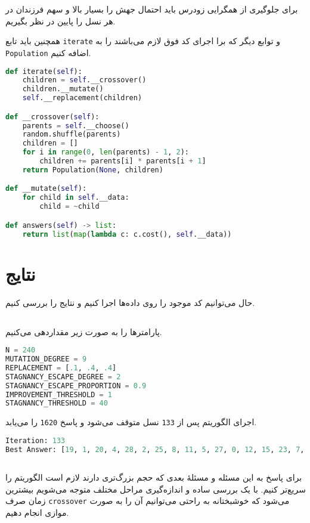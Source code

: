 \documentclass[a4paper, 12pt]{article}
\theoremstyle{definition}
\begin{document}
برای جلوگیری از همگرایی زودرس باید احتمال جهش را بسیار بالا و سهم فرزندان در هر نسل را پایین در نظر بگیریم.

همچنین باید تابع
\texttt{iterate}
و توابع دیگر که برا اجرای کد فوق لازم می‌باشند را به
\texttt{Population}
اضافه کنیم.

\LTR
\begin{lstlisting}[language=Python]
def iterate(self):
    children = self.__crossover()
    children.__mutate()
    self.__replacement(children)

def __crossover(self):
    parents = self.__choose()
    random.shuffle(parents)
    children = []
    for i in range(0, len(parents) - 1, 2):
        children += parents[i] * parents[i + 1]
    return Population(None, children)

def __mutate(self):
    for child in self.__data:
        child = ~child

def answers(self) -> list:
    return list(map(lambda c: c.cost(), self.__data))
\end{lstlisting}
\RTL

\section{نتایج}

حال می‌توانیم کد موجود را روی داده‌ها اجرا کنیم و نتایج را بررسی کنیم.

\subsection{}

پارامترها را به صورت زیر مقداردهی می‌کنیم.

\LTR
\begin{lstlisting}[language=Python]
N = 240
MUTATION_DEGREE = 9
REPLACEMENT = [.1, .4, .4]
STAGNANCY_ESCAPE_DEGREE = 2
STAGNANCY_ESCAPE_PROPORTION = 0.9
IMPROVEMENT_THRESHOLD = 1
STAGNANCY_THRESHOLD = 40
\end{lstlisting}
\RTL


اجرای الگوریتم پس از
\texttt{133}
نسل متوقف می‌شود و پاسخ
\texttt{1620}
را می‌یابد.

\LTR
\begin{lstlisting}[language=Python]
Iteration: 133
Best Answer: [19, 1, 20, 4, 28, 2, 25, 8, 11, 5, 27, 0, 12, 15, 23, 7, 26, 22, 6, 24, 18, 10, 21, 16, 13, 17, 14, 3, 9]: 1620
\end{lstlisting}
\RTL

\subsection{}
برای پاسخ به این مسئله و مسئلهٔ بعدی که حجم بزرگ‌تری دارند لازم است الگوریتم را سریع‌تر کنیم. با یک بررسی ساده و اندازه‌گیری مراحل مختلف متوجه می‌شویم بیشترین زمان صرف
\texttt{crossover}
می‌شود که خوشبختانه به راحتی می‌توانیم آن را به صورت موازی انجام دهیم.
\end{document}
